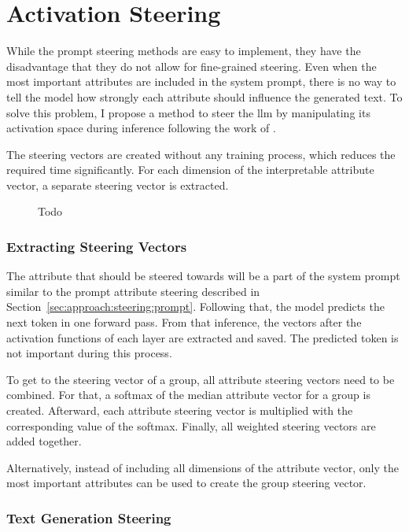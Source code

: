 \section{Activation Steering}

While the prompt steering methods are easy to implement, they have the disadvantage that they do not allow for fine-grained steering. Even when the most important attributes are included in the system prompt, there is no way to tell the model how strongly each attribute should influence the generated text. To solve this problem, I propose a method to steer the \ac{llm} by manipulating its activation space during inference following the work of \citet{turnerActivationAdditionSteering2024,rimsky-etal-2024-steering}.

The steering vectors are created without any training process, which reduces the required time significantly. For each dimension of the interpretable attribute vector, a separate steering vector is extracted.

\begin{figure}
  
  \label{fig:activationSteering}
  \caption{Todo}
\end{figure}

\subsubsection{Extracting Steering Vectors}
The attribute that should be steered towards will be a part of the system prompt similar to the prompt attribute steering described in Section~\ref{sec:approach:steering:prompt}. Following that, the model predicts the next token in one forward pass. From that inference, the vectors after the activation functions of each layer are extracted and saved. The predicted token is not important during this process. %

To get to the steering vector of a group, all attribute steering vectors need to be combined. For that, a softmax of the median attribute vector for a group is created. Afterward, each attribute steering vector is multiplied with the corresponding value of the softmax. Finally, all weighted steering vectors are added together.

Alternatively, instead of including all dimensions of the attribute vector, only the most important attributes can be used to create the group steering vector.

\subsubsection{Text Generation Steering}





